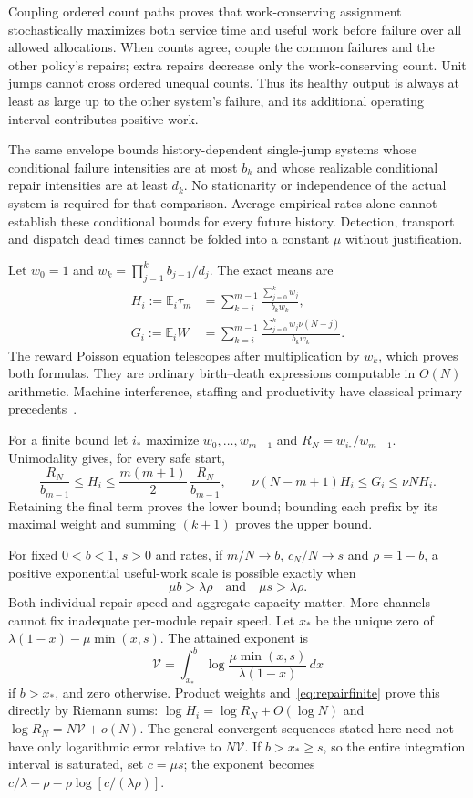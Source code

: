 \documentclass[10pt,a4paper]{article}
\newcommand{\E}{\mathbb E}\newcommand{\Pp}{\mathbb P}
\begin{document}
Coupling ordered count paths proves that work-conserving assignment stochastically maximizes both service time and useful work before failure over all allowed allocations. When counts agree, couple the common failures and the other policy's repairs; extra repairs decrease only the work-conserving count. Unit jumps cannot cross ordered unequal counts. Thus its healthy output is always at least as large up to the other system's failure, and its additional operating interval contributes positive work.

The same envelope bounds history-dependent single-jump systems whose conditional failure intensities are at most $b_k$ and whose realizable conditional repair intensities are at least $d_k$. No stationarity or independence of the actual system is required for that comparison. Average empirical rates alone cannot establish these conditional bounds for every future history. Detection, transport and dispatch dead times cannot be folded into a constant $\mu$ without justification.

Let $w_0=1$ and $w_k=\prod_{j=1}^k b_{j-1}/d_j$. The exact means are
\begin{align}
H_i:=\E_i\tau_m&=\sum_{k=i}^{m-1}\frac{\sum_{j=0}^k w_j}{b_k w_k},\\
G_i:=\E_i W&=\sum_{k=i}^{m-1}\frac{\sum_{j=0}^k w_j\nu(N-j)}{b_k w_k}.
\end{align}
The reward Poisson equation telescopes after multiplication by $w_k$, which proves both formulas. They are ordinary birth--death expressions computable in $O(N)$ arithmetic. Machine interference, staffing and productivity have classical primary precedents~\cite{naor,salia,crampes}.

For a finite bound let $i_*$ maximize $w_0,\ldots,w_{m-1}$ and $R_N=w_{i_*}/w_{m-1}$. Unimodality gives, for every safe start,
\begin{equation}
\frac{R_N}{b_{m-1}}\le H_i\le
\frac{m(m+1)}2\,\frac{R_N}{b_{m-1}},
\qquad
\nu(N-m+1)H_i\le G_i\le\nu N H_i.
\label{eq:repairfinite}
\end{equation}
Retaining the final term proves the lower bound; bounding each prefix by its maximal weight and summing $(k+1)$ proves the upper bound.

For fixed $0<b<1$, $s>0$ and rates, if $m/N\to b$, $c_N/N\to s$ and $\rho=1-b$, a positive exponential useful-work scale is possible exactly when
\begin{equation}
\boxed{\mu b>\lambda\rho\quad\text{and}\quad\mu s>\lambda\rho.}
\label{eq:capacity}
\end{equation}
Both individual repair speed and aggregate capacity matter. More channels cannot fix inadequate per-module repair speed. Let $x_*$ be the unique zero of
$\lambda(1-x)-\mu\min(x,s)$. The attained exponent is
\[
\mathcal V=\int_{x_*}^{b}
\log\frac{\mu\min(x,s)}{\lambda(1-x)}\,dx
\]
if $b>x_*$, and zero otherwise. Product weights and~\eqref{eq:repairfinite} prove this directly by Riemann sums: $\log H_i=\log R_N+O(\log N)$ and $\log R_N=N\mathcal V+o(N)$. The general convergent sequences stated here need not have only logarithmic error relative to $N\mathcal V$. If $b>x_*\ge s$, so the entire integration interval is saturated, set $c=\mu s$; the exponent becomes
$c/\lambda-\rho-\rho\log[c/(\lambda\rho)]$.
\end{document}
